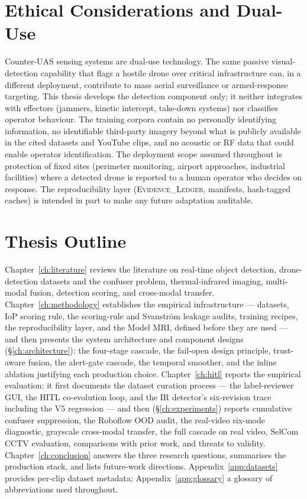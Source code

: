 \section{Ethical Considerations and Dual-Use}
\label{sec:ethics}

Counter-UAS sensing systems are dual-use technology. The same passive visual-detection capability that flags a hostile drone over critical infrastructure can, in a different deployment, contribute to mass aerial surveillance or armed-response targeting. This thesis develops the detection component only; it neither integrates with effectors (jammers, kinetic intercept, take-down systems) nor classifies operator behaviour. The training corpora contain no personally identifying information, no identifiable third-party imagery beyond what is publicly available in the cited datasets and YouTube clips, and no acoustic or RF data that could enable operator identification. The deployment scope assumed throughout is protection of fixed sites (perimeter monitoring, airport approaches, industrial facilities) where a detected drone is reported to a human operator who decides on response. The reproducibility layer (\textsc{Evidence\_Ledger}, manifests, hash-tagged caches) is intended in part to make any future adaptation auditable.

\section{Thesis Outline}
\label{sec:outline}

Chapter~\ref{ch:literature} reviews the literature on real-time object detection, drone-detection datasets and the confuser problem, thermal-infrared imaging, multi-modal fusion, detection scoring, and cross-modal transfer. Chapter~\ref{ch:methodology} establishes the empirical infrastructure --- datasets, IoP scoring rule, the scoring-rule and Svanstr\"om leakage audits, training recipes, the reproducibility layer, and the Model MRI, defined before they are used --- and then presents the system architecture and component designs (\S\ref{ch:architecture}): the four-stage cascade, the fail-open design principle, trust-aware fusion, the alert-gate cascade, the temporal smoother, and the inline ablation justifying each production choice. Chapter~\ref{ch:hitl} reports the empirical evaluation: it first documents the dataset curation process --- the label-reviewer GUI, the HITL co-evolution loop, and the IR detector's six-revision trace including the V5 regression --- and then (\S\ref{ch:experiments}) reports cumulative confuser suppression, the Roboflow OOD audit, the real-video six-mode diagnostic, grayscale cross-modal transfer, the full cascade on real video, SelCom CCTV evaluation, comparisons with prior work, and threats to validity. Chapter~\ref{ch:conclusion} answers the three research questions, summarises the production stack, and lists future-work directions. Appendix~\ref{app:datasets} provides per-clip dataset metadata; Appendix~\ref{app:glossary} a glossary of abbreviations used throughout.

